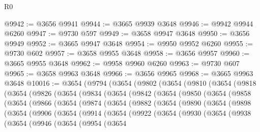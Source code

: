 \begin{lexlean}{R0}
\begin{coremodule}
@9942 := @3656 @9941
@9944 := @3665 @9939 @3648
@9946 := @9942 @9944 @6260
@9947 := @9730 @597
@9949 := @3658 @9947 @3648
@9950 := @3656 @9949
@9952 := @3665 @9947 @3648
@9954 := @9950 @9952 @6260
@9955 := @9730 @602
@9957 := @3658 @9955 @3648
@9958 := @3656 @9957
@9960 := @3665 @9955 @3648
@9962 := @9958 @9960 @6260
@9963 := @9730 @607
@9965 := @3658 @9963 @3648
@9966 := @3656 @9965
@9968 := @3665 @9963 @3648
@10016 := @3654
    (@9794
      (@3654
        (@9802
          (@3654
            (@9810
              (@3654
                (@9818
                  (@3654
                    (@9826
                      (@3654
                        (@9834
                          (@3654
                            (@9842
                              (@3654
                                (@9850
                                  (@3654
                                    (@9858
                                      (@3654
                                        (@9866
                                          (@3654
                                            (@9874
                                              (@3654
                                                (@9882
                                                  (@3654
                                                    (@9890
                                                      (@3654
                                                        (@9898
                                                          (@3654
                                                            (@9906
                                                              (@3654
                                                                (@9914
                                                                  (@3654
                                                                    (@9922
                                                                      (@3654
                                                                        (@9930
                                                                          (@3654
                                                                            (@9938
                                                                              (@3654
                                                                                (@9946
                                                                                  (@3654
                                                                                    (@9954
                                                                                      (@3654

\end{coremodule}
\end{lexlean}
